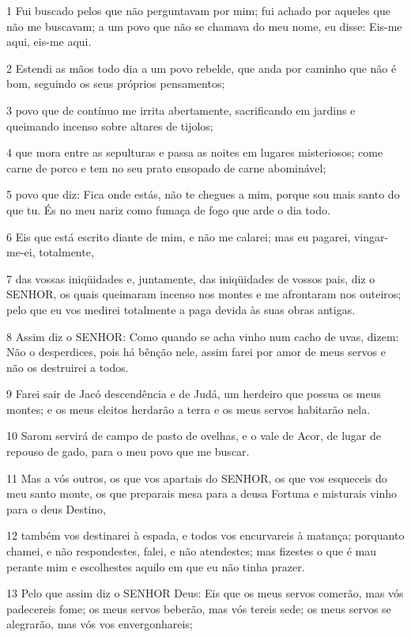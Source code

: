 \par 1 Fui buscado pelos que não perguntavam por mim; fui achado por aqueles que não me buscavam; a um povo que não se chamava do meu nome, eu disse: Eis-me aqui, eis-me aqui.
\par 2 Estendi as mãos todo dia a um povo rebelde, que anda por caminho que não é bom, seguindo os seus próprios pensamentos;
\par 3 povo que de contínuo me irrita abertamente, sacrificando em jardins e queimando incenso sobre altares de tijolos;
\par 4 que mora entre as sepulturas e passa as noites em lugares misteriosos; come carne de porco e tem no seu prato ensopado de carne abominável;
\par 5 povo que diz: Fica onde estás, não te chegues a mim, porque sou mais santo do que tu. És no meu nariz como fumaça de fogo que arde o dia todo.
\par 6 Eis que está escrito diante de mim, e não me calarei; mas eu pagarei, vingar-me-ei, totalmente,
\par 7 das vossas iniqüidades e, juntamente, das iniqüidades de vossos pais, diz o SENHOR, os quais queimaram incenso nos montes e me afrontaram nos outeiros; pelo que eu vos medirei totalmente a paga devida às suas obras antigas.
\par 8 Assim diz o SENHOR: Como quando se acha vinho num cacho de uvas, dizem: Não o desperdices, pois há bênção nele, assim farei por amor de meus servos e não os destruirei a todos.
\par 9 Farei sair de Jacó descendência e de Judá, um herdeiro que possua os meus montes; e os meus eleitos herdarão a terra e os meus servos habitarão nela.
\par 10 Sarom servirá de campo de pasto de ovelhas, e o vale de Acor, de lugar de repouso de gado, para o meu povo que me buscar.
\par 11 Mas a vós outros, os que vos apartais do SENHOR, os que vos esqueceis do meu santo monte, os que preparais mesa para a deusa Fortuna e misturais vinho para o deus Destino,
\par 12 também vos destinarei à espada, e todos vos encurvareis à matança; porquanto chamei, e não respondestes, falei, e não atendestes; mas fizestes o que é mau perante mim e escolhestes aquilo em que eu não tinha prazer.
\par 13 Pelo que assim diz o SENHOR Deus: Eis que os meus servos comerão, mas vós padecereis fome; os meus servos beberão, mas vós tereis sede; os meus servos se alegrarão, mas vós vos envergonhareis;
